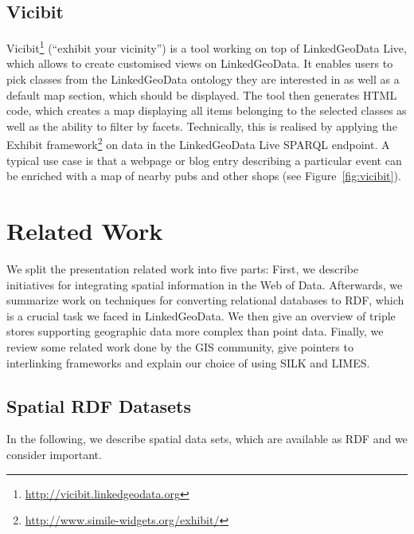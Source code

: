 \subsection{Vicibit}

Vicibit\footnote{\url{http://vicibit.linkedgeodata.org}} (``exhibit your vicinity'') is a tool working on top of LinkedGeoData Live, which allows to create customised views on LinkedGeoData.
It enables users to pick classes from the LinkedGeoData ontology they are
interested in as well as a default map section, which should be displayed. The tool then generates HTML code, which creates a map displaying all items belonging to the selected classes as well as the ability to filter by facets. Technically, this is realised by applying the Exhibit framework\footnote{\url{http://www.simile-widgets.org/exhibit/}} on data in the LinkedGeoData Live SPARQL endpoint. A typical use case is that a webpage or blog entry describing a particular event can be enriched with a map of nearby pubs and other shops (see Figure~\ref{fig:vicibit}).



\section{Related Work}
\label{sec:related}

We split the presentation related work into five parts: 
First, we describe initiatives for integrating spatial information in the Web of Data. 
Afterwards, we summarize work on techniques for converting relational databases to RDF,
which is a crucial task we faced in LinkedGeoData. 
We then give an overview of triple stores supporting geographic data more complex than
point data. Finally, we review some related work done by the GIS community, give
pointers to interlinking frameworks and explain our choice of using SILK and LIMES.

\subsection{Spatial RDF Datasets}

In the following, we describe spatial data sets, which are available as RDF and we consider important.

